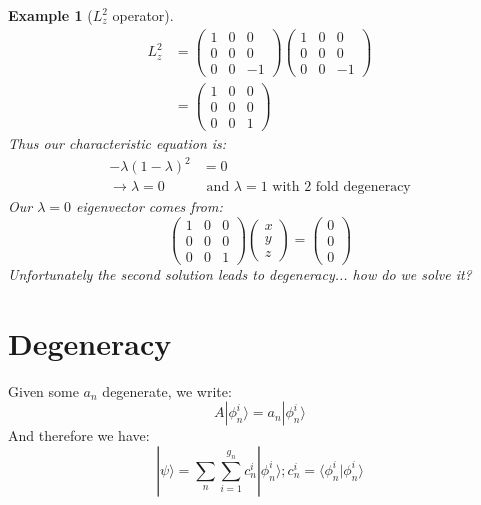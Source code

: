 \documentclass[a4paper, 11pt]{article}
\newtheorem*{Example}{Example}
\begin{document}
\begin{Example}[$L_z^2$ operator]
	\begin{align*}
		L_z^2 &= \begin{pmatrix}1 & 0 & 0 \\ 0 & 0 & 0 \\ 0 & 0 & -1\end{pmatrix}\begin{pmatrix}1 & 0 & 0 \\ 0 & 0 & 0 \\ 0 & 0 & -1\end{pmatrix} \\ 
			&= \begin{pmatrix}1 & 0 & 0 \\ 0 & 0 & 0 \\ 0 & 0 & 1\end{pmatrix}
	\end{align*}
	Thus our characteristic equation is: 
		\begin{align*}
			-\lambda(1-\lambda)^2 &= 0 \\ 
			\rightarrow \lambda = 0 &\text{ and } \lambda = 1 \text { with 2 fold degeneracy} 
		\end{align*}
	Our $\lambda = 0$ eigenvector comes from: 
		\begin{equation*}
			\begin{pmatrix}1 & 0 & 0 \\ 0 & 0 & 0 \\ 0 & 0 & 1\end{pmatrix}\begin{pmatrix}x \\ y \\ z\end{pmatrix} = \begin{pmatrix} 0 \\ 0 \\ 0 \end{pmatrix}
		\end{equation*}
	Unfortunately the second solution leads to degeneracy... how do we solve it? 
\end{Example}



\section*{Degeneracy} 
Given some $a_n$ degenerate, we write: 
	\begin{equation*}
		A|\phi_n^i\rangle = a_n |\phi_n^i\rangle 
	\end{equation*}
And therefore we have: 
	\begin{equation}
		|\psi\rangle = \sum_n \sum\limits_{i=1}^{g_n}c_n^i|\phi_n^i\rangle; c_n^i = \langle\phi_n^i|\phi_n^i\rangle
	\end{equation}
	
\end{document}

